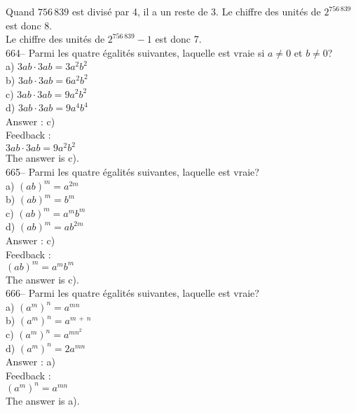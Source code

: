 \documentclass[letterpaper, 12pt]{article}
\begin{document}
Quand $756\,839$ est divis\'e par 4, il a un reste de 3.  Le chiffre des
unit\'es de $2^{756\,839}$ est donc 8.\\
Le chiffre des unit\'es de $2^{756\,839}-1$ est donc 7.  \\

664-- Parmi les quatre \'egalit\'es suivantes, laquelle est vraie si
$a\neq0$ et $b \neq 0$?\\
a) $3ab\cdot3ab=3a^{2}b^{2}$\\
b) $3ab\cdot3ab=6a^{2}b^{2}$\\
c) $3ab\cdot3ab=9a^{2}b^{2}$\\
d) $3ab\cdot3ab= 9a^{4}b^{4}$\\

Answer : c)\\

Feedback : \\
$3ab\cdot3ab=9a^{2}b^{2}$\\
The answer is c).\\

665-- Parmi les quatre \'egalit\'es suivantes, laquelle est vraie?\\
a) $\left( ab\right) ^m=a^{2m}$\\
b) $\left( ab\right) ^m=b^{m}$\\
c) $\left( ab\right) ^m=a^{m}b^{m}$\\
d) $\left( ab\right) ^m=ab^{2m}$\\

Answer : c)\\

Feedback : \\
$\left( ab\right) ^m=a^{m}b^{m}$\\
The answer is c).\\

666-- Parmi les quatre \'egalit\'es suivantes, laquelle est vraie?\\
a) $\left( a^{m}\right)^{n}=a^{mn}$ \\
b) $\left( a^{m}\right)^{n}=a^{m\,+\,n}$ \\
c) $\left( a^{m}\right)^{n}=a^{mn^{2}}$ \\
d) $\left( a^{m}\right)^{n}=2a^{mn}$ \\

Answer : a)\\

Feedback : \\
$\left( a^{m}\right)^{n}=a^{mn}$ \\
The answer is a).\\
\end{document}
